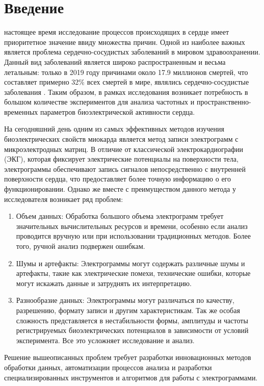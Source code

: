 \chapter{Введение}
 настоящее время исследование процессов происходящих в сердце имеет
приоритетное значение ввиду множества причин. Одной из наиболее важных является
проблема сердечно-сосудистых заболеваний в мировом здравоохранении. Данный вид
заболеваний является широко распространенным и весьма летальным: только в 2019
году причинами около 17.9 миллионов смертей, что составляет примерно 32\% всех
смертей в мире, являлись сердечно-сосудистые заболевания \cite{who}. Таким
образом, в рамках исследования возникает потребность в большом количестве
экспериментов для анализа частотных и пространственно-временных параметров
биоэлектрической активности сердца.

На сегодняшний день одним из самых эффективных методов изучения
биоэлектрических свойств миокарда является метод записи электрограмм с
микроэлектродных матриц. В отличие от классической электрокардиографии (ЭКГ),
которая фиксирует электрические потенциалы на поверхности тела, электрограммы
обеспечивают запись сигналов непосредственно с внутренней поверхности сердца,
что предоставляет более точную информацию о его функционировании. Однако же
вместе с преимуществом данного метода у исследователя возникает ряд проблем:

\begin{enumerate}
	\item Объем данных: Обработка большого объема электрограмм требует
	значительных вычислительных ресурсов и времени, особенно если анализ
	проводится вручную или при использовании традиционных методов. Более того,
	ручной анализ подвержен ошибкам.

	\item Шумы и артефакты: Электрограммы могут содержать различные шумы и
	артефакты, такие как электрические помехи, технические ошибки, которые
	могут искажать данные и затруднять их интерпретацию.

	\item Разнообразие данных: Электрограммы могут различаться по качеству,
	разрешению, формату записи и другим характеристикам. Так же особая
	сложность представляется в нестабильности формы, амплитуды и частоты
	регистрируемых биоэлектрических потенциалов в зависимости от условий
	эксперимента. Все это усложняет исследование и анализ.
\end{enumerate}

Решение вышеописанных проблем требует разработки инновационных методов обработки данных,
автоматизации процессов анализа и разработки специализированных инструментов и
алгоритмов для работы с электрограммами.

